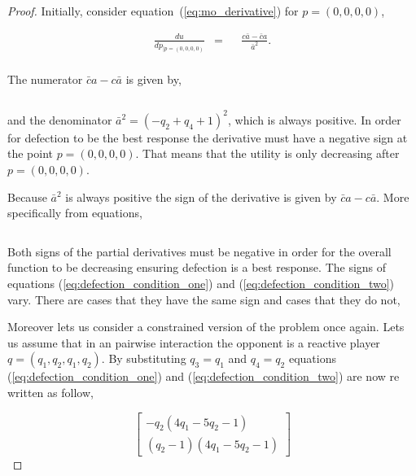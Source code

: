 \documentclass[10pt]{article}
\begin{document}
\begin{proof}
Initially, consider equation~(\ref{eq:mo_derivative}) for \(p = (0, 0, 0,
0)\),

\begin{equation}\label{eq:derivative_of_quadratic_zero}
    \begin{aligned}
     \frac{du}{dp_{| p=(0, 0, 0, 0)}} & = && \frac{c \bar{a} - \bar{c}a}
      {\bar{a}^2} .\\
    \end{aligned}
\end{equation}

The numerator \(\bar{c}a - c\bar{a}\) is given by,

\[\]

and the denominator \(\bar{a} ^ 2 = (-q_2 + q_4 + 1) ^ 2\), which is always positive. In order
for defection to be the best response the derivative must have a negative
sign at the point \(p = (0, 0, 0, 0)\). That means that the utility is only
decreasing after \(p = (0, 0, 0, 0)\).

Because \(\bar{a} ^ 2\) is always positive the sign of the derivative is given by \(\bar{c}a - c\bar{a}\).
More specifically from equations,

\begin{equation}\label{eq:defection_condition_one}
    
\end{equation}
\begin{equation}\label{eq:defection_condition_two}
    
\end{equation}

Both signs of the partial derivatives must be negative in order for the overall
function to be decreasing ensuring defection is a best response.
The signs of equations (\ref{eq:defection_condition_one}) and (\ref{eq:defection_condition_two})
vary. There are cases that they have the same sign and cases that they do not,

Moreover lets us consider a constrained version of the problem once again. Lets us
assume that in an pairwise interaction the opponent is a reactive player \(q=(q_1, q_2, q_1, q_2)\).
By substituting \(q_3=q_1\) and \(q_4=q_2\) equations (\ref{eq:defection_condition_one})
and (\ref{eq:defection_condition_two}) are now re written as follow,

\[\left[\begin{matrix}- q_{2} \left(4 q_{1} - 5 q_{2} - 1\right)\\
\left(q_{2} - 1\right) \left(4 q_{1} - 5 q_{2} - 1\right)\end{matrix}\right]\]

\end{proof}
\end{document}
